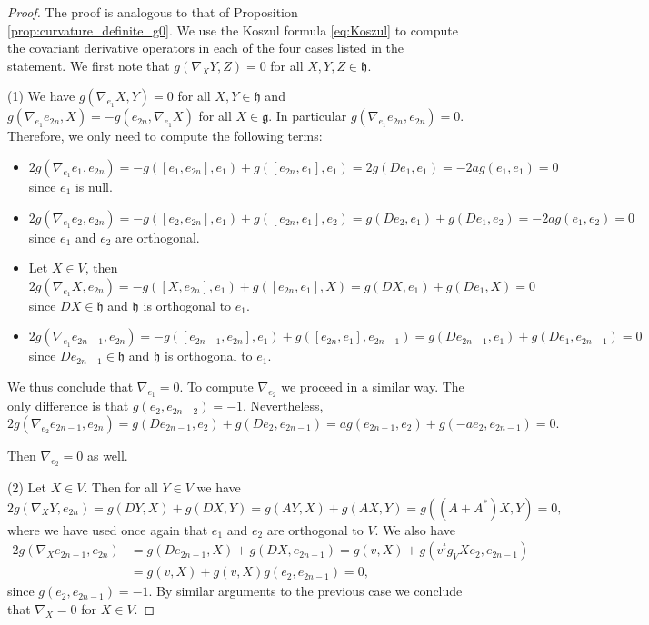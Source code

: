 \documentclass[10pt,a4paper]{amsart}
\newcommand{\frg}{\mathfrak{g}}
\newcommand{\frh}{\mathfrak{h}}
\begin{document}
\begin{proof}
    The proof is analogous to that of Proposition \ref{prop:curvature_definite_g0}. We use the Koszul formula \eqref{eq:Koszul} to compute the covariant derivative operators in each of the four cases listed in the statement. We first note that $g(\nabla_XY,Z)=0$ for all $X,Y,Z\in\frh$.\medskip

    (1) We have $g(\nabla_{e_1}X,Y)=0$ for all $X,Y\in\frh$ and $g(\nabla_{e_1}e_{2n},X)=-g(e_{2n},\nabla_{e_1}X)$ for all $X\in\frg$. In particular $g(\nabla_{e_1}e_{2n},e_{2n})=0$. Therefore, we only need to compute the following terms: \begin{itemize}
        \item $2g(\nabla_{e_1}e_1,e_{2n})=-g([e_1,e_{2n}],e_1)+g([e_{2n},e_1],e_1)=2g(De_1,e_1)=-2ag(e_1,e_1)=0$ since $e_1$ is null.
        \item $2g(\nabla_{e_1}e_2,e_{2n})=-g([e_2,e_{2n}],e_1)+g([e_{2n},e_1],e_2)=g(De_2,e_1)+g(De_1,e_2)=-2ag(e_1,e_2)=0$ since $e_1$ and $e_2$ are orthogonal.
        \item Let $X\in V$, then $2g(\nabla_{e_1}X,e_{2n})=-g([X,e_{2n}],e_1)+g([e_{2n},e_1],X)=g(DX,e_1)+g(De_1,X)=0$ since $DX\in\frh$ and $\frh$ is orthogonal to $e_1$.
        \item $2g(\nabla_{e_1}e_{2n-1},e_{2n})=-g([e_{2n-1},e_{2n}],e_1)+g([e_{2n},e_1],e_{2n-1})=g(De_{2n-1},e_1)+g(De_1,e_{2n-1})=0$ since $De_{2n-1}\in\frh$ and $\frh$ is orthogonal to $e_1$.
    \end{itemize}

    We thus conclude that $\nabla_{e_1}=0$. To compute $\nabla_{e_2}$ we proceed in a similar way. The only difference is that $g(e_2,e_{2n-2})=-1$. Nevertheless, $$2g(\nabla_{e_2}e_{2n-1},e_{2n})=g(De_{2n-1},e_2)+g(De_2,e_{2n-1})=ag(e_{2n-1},e_2)+g(-ae_2,e_{2n-1})=0.$$

    Then $\nabla_{e_2}=0$ as well.\medskip

    (2) Let $X\in V$. Then for all $Y\in V$ we have $$2g(\nabla_XY,e_{2n})=g(DY,X)+g(DX,Y)=g(AY,X)+g(AX,Y)=g((A+A^*)X,Y)=0,$$ where we have used once again that $e_1$ and $e_2$ are orthogonal to $V$. We also have \begin{align*}
        2g(\nabla_Xe_{2n-1},e_{2n})&=g(De_{2n-1},X)+g(DX,e_{2n-1})=g(v,X)+g(v^tg_VXe_2,e_{2n-1})\\
        &=g(v,X)+g(v,X)g(e_2,e_{2n-1})=0,
    \end{align*} since $g(e_2,e_{2n-1})=-1$. By similar arguments to the previous case we conclude that $\nabla_X=0$ for $X\in V$.\medskip


\end{proof}
\end{document}
